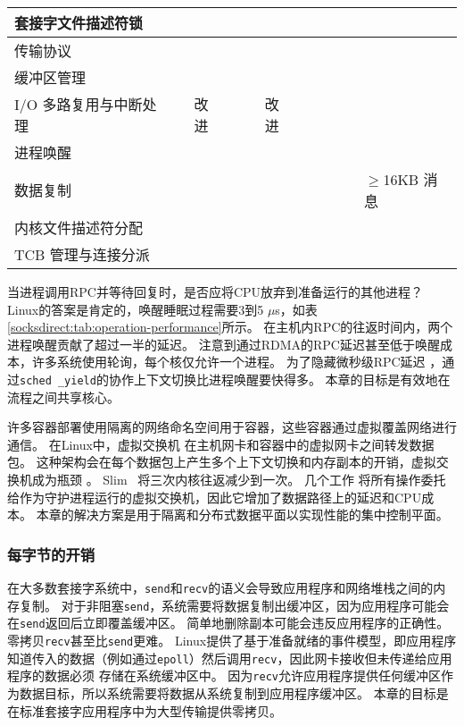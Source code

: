 \begin{sidewaystable*}[t]
{\begin{tabularx}{1.25\textwidth}{l|X|X|X|X|X|X|X|X|X|X|}
			\hline
			套接字文件描述符锁 & & & & & & & & & & \yes \\
			\hline
			传输协议 & & & & & & & & \yes & \yes & \yes \\
			\hline
			缓冲区管理 & & & & & & & & & & \yes \\
			\hline
			I/O 多路复用与中断处理 & & 改进 & \yes & \yes & 改进 & \yes & \yes & \yes & \yes & \yes \\
			\hline
			进程唤醒 & & & & & & & & & & \yes \\
			\hline
			数据复制 & & \yes & & & \yes & & & & & $\ge$16KB 消息 \\
			\hline
			内核文件描述符分配 & & \yes &  &  & \yes & & & & & \yes \\
			\hline
			TCB 管理与连接分派 & \yes & \yes & \yes & \yes & \yes & & & & & \yes \\
			\hline
		\end{tabularx}
	}
\end{sidewaystable*}

 


当进程调用RPC并等待回复时，是否应将CPU放弃到准备运行的其他进程？
Linux的答案是肯定的，唤醒睡眠过程需要3到5 $\mu$s，如表 \ref {socksdirect:tab:operation-performance}所示。
在主机内RPC的往返时间内，两个进程唤醒贡献了超过一半的延迟。
注意到通过RDMA的RPC延迟甚至低于唤醒成本，许多系统使用轮询，每个核仅允许一个进程。
为了隐藏微秒级RPC延迟 \cite {barroso2017attack}，通过\texttt {sched \_yield}的协作上下文切换比进程唤醒要快得多。
本章的目标是有效地在流程之间共享核心。

许多容器部署使用隔离的网络命名空间用于容器，这些容器通过虚拟覆盖网络进行通信。
在Linux中，虚拟交换机 \cite {pfaff2015design}在主机网卡和容器中的虚拟网卡之间转发数据包。
这种架构会在每个数据包上产生多个上下文切换和内存副本的开销，虚拟交换机成为瓶颈 \cite {pfefferle2015hybrid}。
Slim~ \cite {slim}将三次内核往返减少到一次。
几个工作 \cite {martins2014clickos,roghanchi2017ffwd,huang2017high,nsdi19freeflow}将所有操作委托给作为守护进程运行的虚拟交换机，因此它增加了数据路径上的延迟和CPU成本。
本章的解决方案是用于隔离和分布式数据平面以实现性能的集中控制平面。


\subsubsection{每字节的开销}
\label{socksdirect:subsec:per-byte-overhead}

在大多数套接字系统中，\texttt {send}和\texttt {recv}的语义会导致应用程序和网络堆栈之间的内存复制。 对于非阻塞\texttt {send}，系统需要将数据复制出缓冲区，因为应用程序可能会在\texttt {send}返回后立即覆盖缓冲区。 简单地删除副本可能会违反应用程序的正确性。
零拷贝\texttt {recv}甚至比\texttt {send}更难。
Linux提供了基于准备就绪的事件模型，即应用程序知道传入的数据（例如通过\texttt {epoll}）然后调用\texttt {recv}，因此网卡接收但未传递给应用程序的数据必须 存储在系统缓冲区中。
因为\texttt {recv}允许应用程序提供任何缓冲区作为数据目标，所以系统需要将数据从系统复制到应用程序缓冲区。
本章的目标是在标准套接字应用程序中为大型传输提供零拷贝。



